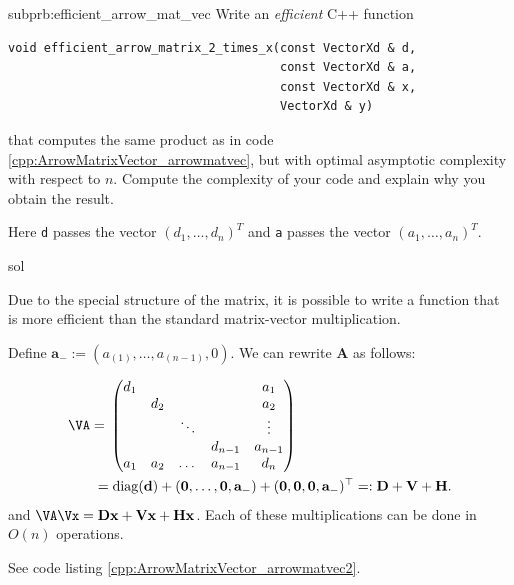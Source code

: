 \begin{samproblem}
\begin{subproblem}{subprb:efficient_arrow_mat_vec}
Write an \emph{efficient} C++ function
\begin{verbatim}
void efficient_arrow_matrix_2_times_x(const VectorXd & d,
                                      const VectorXd & a,
                                      const VectorXd & x,
                                      VectorXd & y)
\end{verbatim}
that computes the same product as in code \ref{cpp:ArrowMatrixVector_arrowmatvec},
but with optimal asymptotic complexity with respect to {$n$}.
Compute the complexity of your code and
explain why you obtain the result.

Here \texttt{d} passes the vector $(d_{1},\ldots,d_{n})^{T}$ and \texttt{a} passes the
vector $(a_{1},\ldots,a_{n})^{T}$.
 \begin{samwriteprbpart}{sol}
\begin{samsolution}
  Due to the special structure of the matrix, it is possible to
  write a function that is more efficient
  than the standard matrix-vector multiplication.

  Define $\mathbf{a}_- := (a_{(1)}, \dots, a_{(n-1)}, 0)$.
  We can rewrite $\mathbf{A}$ as follows:

    \begin{align}
    \VA= \; & \begin{pmatrix}
      d_1 &     &        &         & a_1     \\
          & d_2 &        &         & a_2     \\
          &     & \ddots &         & \vdots  \\
          &     &        & d_{n-1}  & a_{n-1} \\
      a_1 & a_2 & \dots  & a_{n-1}   & d_n     \\
    \end{pmatrix} \\
    = & \; \mathrm{diag}(\mathbf{d}) + (\mathbf{0},\dots,\mathbf{0}, \mathbf{a}_-) + (\mathbf{0},\mathbf{0},\mathbf{0},\mathbf{a}_-)^\top
    =: \mathbf{D} + \mathbf{V} + \mathbf{H}.
    \end{align}
    and $\VA \Vx = \mathbf{D} \mathbf{x} + \mathbf{V} \mathbf{x} + \mathbf{H} \mathbf{x}$. Each of these
    multiplications can be done in $O(n)$ operations.

    See code listing \ref{cpp:ArrowMatrixVector_arrowmatvec2}.
\vspace{0.5cm}


\end{samsolution}
\end{samwriteprbpart}
\end{subproblem}
\end{samproblem}
